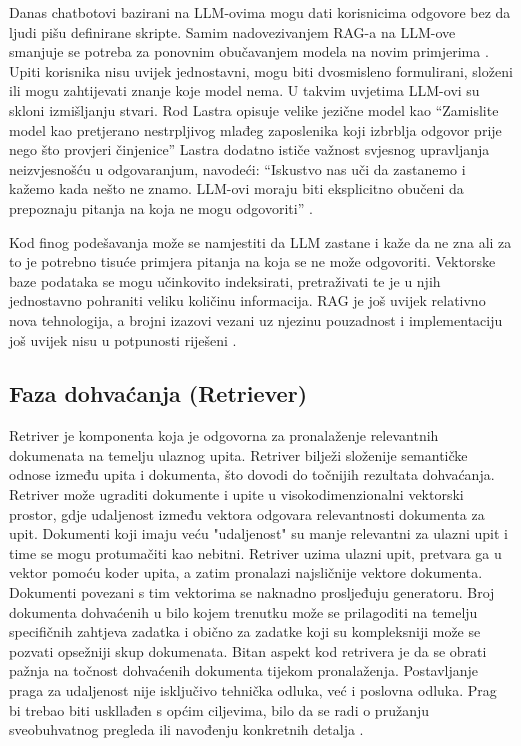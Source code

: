 \documentclass[]{foi}
\begin{document}
Danas chatbotovi bazirani na LLM-ovima mogu dati korisnicima odgovore bez da ljudi pišu definirane skripte. Samim nadovezivanjem RAG-a na LLM-ove smanjuje se potreba za ponovnim obučavanjem 
modela na novim primjerima \cite{ibmRAG}. Upiti korisnika nisu uvijek jednostavni, mogu biti dvosmisleno formulirani, složeni ili mogu zahtijevati znanje koje model nema. U takvim uvjetima 
LLM-ovi su skloni izmišljanju stvari. Rod Lastra opisuje velike jezične model kao “Zamislite model kao pretjerano nestrpljivog mlađeg zaposlenika koji izbrblja odgovor prije nego što provjeri činjenice”
Lastra dodatno ističe važnost svjesnog upravljanja neizvjesnošću u odgovaranjum, navodeći: “Iskustvo nas uči da zastanemo i kažemo kada nešto ne znamo. LLM-ovi moraju biti eksplicitno obučeni da prepoznaju pitanja na koja ne mogu odgovoriti” \cite{ibmRAG}. 

Kod finog podešavanja može se namjestiti da LLM zastane i kaže da ne zna ali za to je potrebno tisuće primjera pitanja na koja se ne može odgovoriti. Vektorske baze podataka 
se mogu učinkovito indeksirati, pretraživati te je u njih jednostavno pohraniti veliku količinu informacija. RAG je još uvijek relativno nova tehnologija, a brojni izazovi vezani uz njezinu
pouzadnost i implementaciju još uvijek nisu u potpunosti riješeni \cite{ibmRAG}.


\subsection{Faza dohvaćanja (Retriever)}

Retriver je komponenta koja je odgovorna za pronalaženje relevantnih dokumenata na temelju ulaznog upita. Retriver bilježi složenije semantičke odnose između upita i dokumenta, što dovodi do točnijih
rezultata dohvaćanja. Retriver može ugraditi dokumente i upite u visokodimenzionalni vektorski prostor, gdje udaljenost između vektora odgovara relevantnosti dokumenta za upit.
Dokumenti koji imaju veću "udaljenost" su manje relevantni za ulazni upit i time se mogu protumačiti kao nebitni. Retriver uzima ulazni upit, pretvara ga u vektor pomoću koder upita, a zatim
pronalazi najsličnije vektore dokumenta. Dokumenti povezani s tim vektorima se naknadno prosljeđuju generatoru. Broj dokumenta dohvaćenih u bilo kojem trenutku može se prilagoditi na temelju
specifičnih zahtjeva zadatka i obično za zadatke koji su kompleksniji može se pozvati opsežniji skup dokumenata.  Bitan aspekt kod retrivera je da se obrati pažnja na točnost dohvaćenih dokumenta
tijekom pronalaženja. Postavljanje praga za udaljenost nije isključivo tehnička odluka, već i poslovna odluka. Prag bi trebao biti uskllađen s općim ciljevima, bilo da se radi o pružanju
sveobuhvatnog pregleda ili navođenju konkretnih detalja \cite{redis2025}. 
\end{document}
